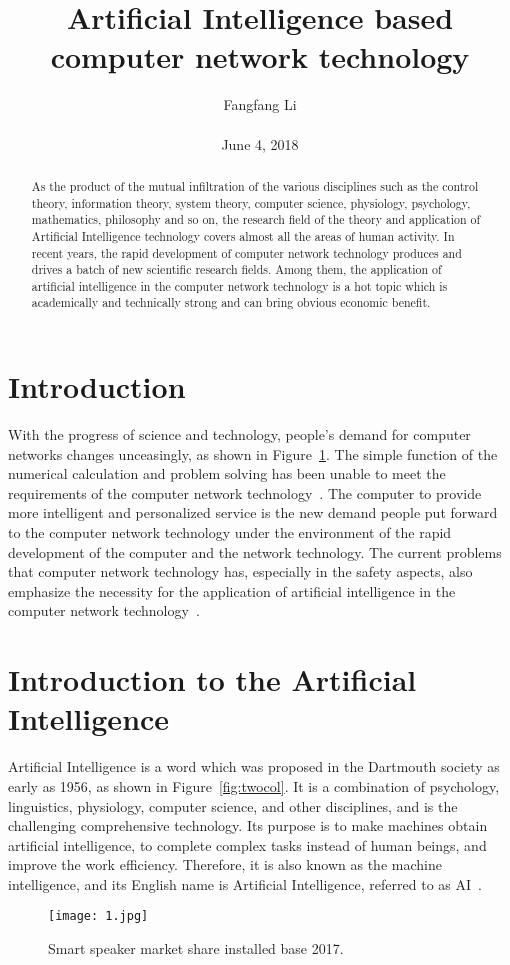 \documentclass[10pt,twocolumn,letterpaper]{article}
\title{\textbf{Artificial Intelligence based computer network technology}}
\author{Fangfang Li\\\\June 4, 2018}
\begin{document}
\maketitle

\begin{abstract}
  As the product of the mutual infiltration of the various disciplines such as the control theory, information theory, system theory, computer science, physiology, psychology, mathematics, philosophy and so on, the research field of the theory and application of Artificial Intelligence technology covers almost all the areas of human activity. In recent years, the rapid development of computer network technology produces and drives a batch of new scientific research fields. Among them, the application of artificial intelligence in the computer network technology is a hot topic which is academically and technically strong and can bring obvious economic benefit.
\end{abstract}

\section{Introduction}
With the progress of science and technology, people’s demand for computer networks changes unceasingly, as shown in Figure~\ref{fig:onecol}. The simple function of the numerical calculation and problem solving has been unable to meet the requirements of the computer network technology~\cite{horn1981determining}. The computer to provide more intelligent and personalized service is the new demand people put forward to the computer network technology under the environment of the rapid development of the computer and the network technology. The current problems that computer network technology has, especially in the safety aspects, also emphasize the necessity for the application of artificial intelligence in the computer network technology~\cite{fikes1971strips}.


\section{Introduction to the Artificial Intelligence}
Artificial Intelligence is a word which was proposed in the Dartmouth society as early as 1956, as shown in Figure~\ref{fig:twocol}. It is a combination of psychology, linguistics, physiology, computer science, and other disciplines, and is the challenging comprehensive technology. Its purpose is to make machines obtain artificial intelligence, to complete complex tasks instead of human beings, and improve the work efficiency. Therefore, it is also known as the machine intelligence, and its English name is Artificial Intelligence, referred to as AI~\cite{Kong_2016_CVPR_Workshops}.
\begin{figure}[!htb]
\begin{center}
   \texttt{[image: 1.jpg]}
\end{center}
   \caption{Smart speaker market share installed base 2017.}
\label{fig:onecol}
\end{figure}
\end{document}
